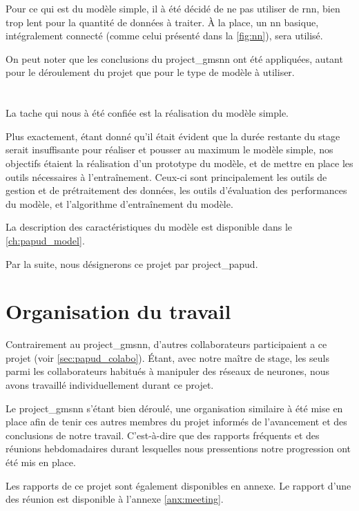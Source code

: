 Pour ce qui est du modèle simple, il à été décidé de ne pas utiliser de \gls{rnn}, bien trop lent pour la quantité de données à traiter. À la place, un \gls{nn} basique, intégralement connecté (comme celui présenté dans la \autoref{fig:nn}), sera utilisé. %

On peut noter que les conclusions du \gls{project_gmsnn} ont été appliquées, autant pour le déroulement du projet que pour le type de modèle à utiliser.


\section{}
La tache qui nous à été confiée est la réalisation du modèle simple.

Plus exactement, étant donné qu'il était évident que la durée restante du stage serait insuffisante pour réaliser et pousser au maximum le modèle simple, nos objectifs étaient la réalisation d'un prototype du modèle, et de mettre en place les outils nécessaires à l'entraînement.
Ceux-ci sont principalement les outils de gestion et de prétraitement des données, les outils d'évaluation des performances du modèle, et l'algorithme d'entraînement du modèle.

La description des caractéristiques du modèle est disponible dans le \autoref{ch:papud_model}.

Par la suite, nous désignerons ce projet par \og \gls{project_papud}\fg{}.

\section{Organisation du travail}
Contrairement au \gls{project_gmsnn}, d'autres collaborateurs participaient a ce projet (voir \autoref{sec:papud_colabo}).
Étant, avec notre maître de stage, les seuls parmi les collaborateurs habitués à manipuler des réseaux de neurones, nous avons travaillé individuellement durant ce projet.

Le \gls{project_gmsnn} s'étant bien déroulé, une organisation similaire à été mise en place afin de tenir ces autres membres du projet informés de l'avancement et des conclusions de notre travail.
C'est-à-dire que des rapports fréquents et des réunions hebdomadaires durant lesquelles nous pressentions notre progression ont été mis en place.

Les rapports de ce projet sont également disponibles en annexe.
Le rapport d'une des réunion est disponible à l'annexe \ref{anx:meeting}. %


